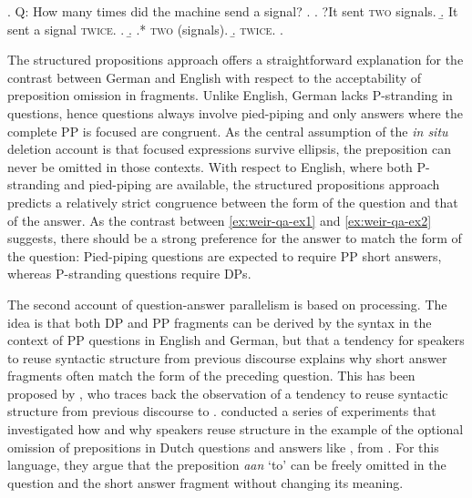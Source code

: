 \ex. \label{ex:weir-qa-ex2}
Q: How many times did the machine send a signal? \hfill \citep[1289]{weir2018}
\a. \a. ?It sent \textsc{two} signals.
    \b. It sent a signal \textsc{twice}.
    \z.
\b.
\a.* \textsc{two} (signals).
\b. \textsc{twice}.
\z.

The structured propositions approach offers a straightforward explanation for the contrast between German and English with respect to the acceptability of preposition omission in fragments. Unlike English, German lacks P-stranding in questions, hence questions always involve pied-piping and only answers where the complete PP is focused are congruent. As the central assumption of the \textit{in situ} deletion account is that focused expressions survive ellipsis, the preposition can never be omitted in those contexts. With respect to English, where both P-stranding and pied-piping are available, the structured propositions approach predicts a relatively strict congruence between the form of the question and that of the answer. As the contrast between \ref{ex:weir-qa-ex1} and \ref{ex:weir-qa-ex2} suggests, there should be a strong preference for the answer to match the form of the question: Pied-piping questions are expected to require PP short answers, whereas P-stranding questions require DPs.

The second account of question-answer parallelism is based on processing. The idea is that both DP and PP fragments can be derived by the syntax in the context of PP questions in English and German, but that a tendency for speakers to reuse syntactic structure from previous discourse explains why short answer fragments often match the form of the preceding question. This has been proposed by \citet{nykiel2017}, who traces back the observation of a tendency to reuse syntactic structure from previous discourse to \citet{levelt.kelter1982}. \citet{levelt.kelter1982} conducted a series of experiments that investigated how and why speakers reuse structure in the example of the optional omission of prepositions in Dutch questions and answers like \Next, from \citet[80]{levelt.kelter1982}. For this language, they argue that the preposition \textit{aan} `to' can be freely omitted in the question and the short answer fragment without changing its meaning.


